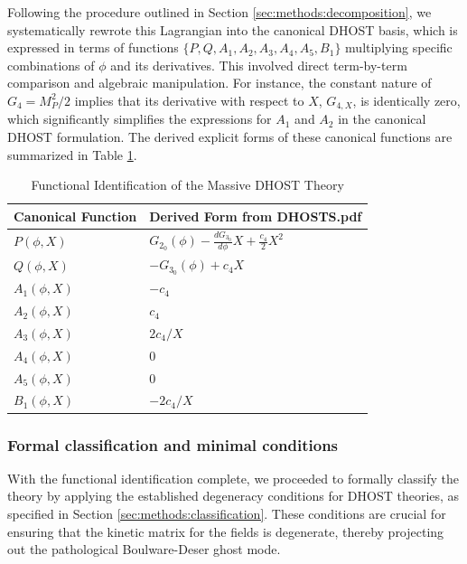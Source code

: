 \documentclass[twocolumn]{aastex631}
\begin{document}
Following the procedure outlined in Section \ref{sec:methods:decomposition}, we systematically rewrote this Lagrangian into the canonical DHOST basis, which is expressed in terms of functions $\{P, Q, A_1, A_2, A_3, A_4, A_5, B_1\}$ multiplying specific combinations of $\phi$ and its derivatives. This involved direct term-by-term comparison and algebraic manipulation. For instance, the constant nature of $G_4 = M_P^2/2$ implies that its derivative with respect to $X$, $G_{4,X}$, is identically zero, which significantly simplifies the expressions for $A_1$ and $A_2$ in the canonical DHOST formulation. The derived explicit forms of these canonical functions are summarized in Table \ref{tab:functional_identification}.

\begin{table}[t]
\caption{Functional Identification of the Massive DHOST Theory}
\label{tab:functional_identification}
\centering
\begin{tabular}{|l|l|}
\hline
\textbf{Canonical Function} & \textbf{Derived Form from DHOSTS.pdf} \\
\hline
$P(\phi,X)$ & $G_{2_0}(\phi) - \frac{dG_{3_0}}{d\phi} X + \frac{c_4}{2} X^2$ \\
$Q(\phi,X)$ & $-G_{3_0}(\phi) + c_4 X$ \\
$A_1(\phi,X)$ & $-c_4$ \\
$A_2(\phi,X)$ & $c_4$ \\
$A_3(\phi,X)$ & $2c_4/X$ \\
$A_4(\phi,X)$ & $0$ \\
$A_5(\phi,X)$ & $0$ \\
$B_1(\phi,X)$ & $-2c_4/X$ \\
\hline
\end{tabular}
\end{table}

\subsubsection{Formal classification and minimal conditions}
With the functional identification complete, we proceeded to formally classify the theory by applying the established degeneracy conditions for DHOST theories, as specified in Section \ref{sec:methods:classification}. These conditions are crucial for ensuring that the kinetic matrix for the fields is degenerate, thereby projecting out the pathological Boulware-Deser ghost mode.
\end{document}
